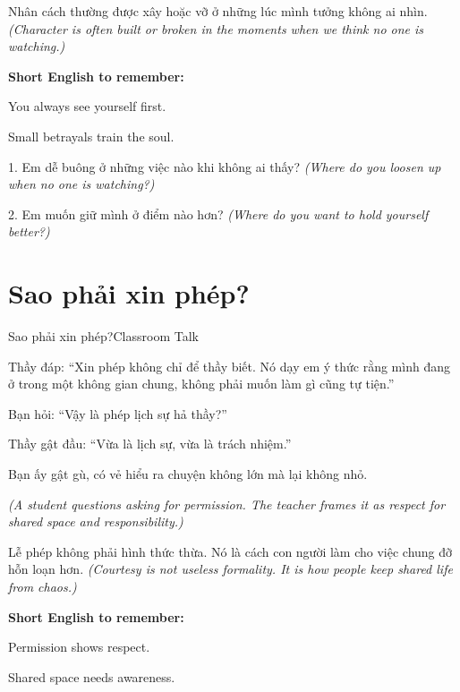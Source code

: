 \begin{baihoc}
Nhân cách thường được xây hoặc vỡ ở những lúc mình tưởng không ai nhìn.
\textit{(Character is often built or broken in the moments when we think no one is watching.)}
\end{baihoc}

\begin{ghinhoanh}
\textbf{Short English to remember:}

You always see yourself first.

Small betrayals train the soul.
\end{ghinhoanh}

\begin{tuhocnhanh}
1. Em dễ buông ở những việc nào khi không ai thấy? \textit{(Where do you loosen up when no one is watching?)}

2. Em muốn giữ mình ở điểm nào hơn? \textit{(Where do you want to hold yourself better?)}
\end{tuhocnhanh}
\ngancach

\section{Sao phải xin phép?}
\begin{truyen}{Sao phải xin phép?}{Classroom Talk}

Thầy đáp: ``Xin phép không chỉ để thầy biết. Nó dạy em ý thức rằng mình đang ở trong một không gian chung, không phải muốn làm gì cũng tự tiện.''

Bạn hỏi: ``Vậy là phép lịch sự hả thầy?''

Thầy gật đầu: ``Vừa là lịch sự, vừa là trách nhiệm.''

Bạn ấy gật gù, có vẻ hiểu ra chuyện không lớn mà lại không nhỏ.

\textit{(A student questions asking for permission. The teacher frames it as respect for shared space and responsibility.)}
\end{truyen}

\begin{baihoc}
Lễ phép không phải hình thức thừa. Nó là cách con người làm cho việc chung đỡ hỗn loạn hơn.
\textit{(Courtesy is not useless formality. It is how people keep shared life from chaos.)}
\end{baihoc}

\begin{ghinhoanh}
\textbf{Short English to remember:}

Permission shows respect.

Shared space needs awareness.
\end{ghinhoanh}

